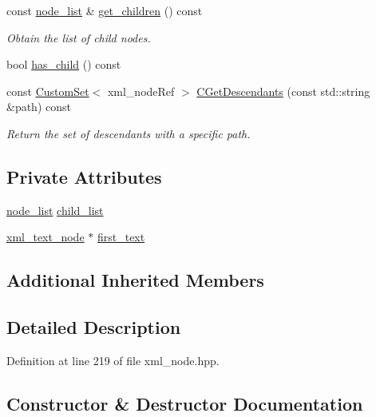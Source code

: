 \begin{DoxyCompactItemize}
const \hyperlink{classxml__node_a4e558f6b9e873e9d0e92cfc8e7880385}{node\+\_\+list} \& \hyperlink{classxml__child_a689d7129c84ed308dbf89719fa0958bf}{get\+\_\+children} () const
\begin{DoxyCompactList}\small\item\em Obtain the list of child nodes. \end{DoxyCompactList}\item 
bool \hyperlink{classxml__child_a31f81ff44aa268c1886fc9805f5c0bdd}{has\+\_\+child} () const
\item 
const \hyperlink{custom__set_8hpp_a615bc2f42fc38a4bb1790d12c759e86f}{Custom\+Set}$<$ xml\+\_\+node\+Ref $>$ \hyperlink{classxml__child_ae73bf4c48fc19ebe96e54bfdad7cfe5a}{C\+Get\+Descendants} (const std\+::string \&path) const
\begin{DoxyCompactList}\small\item\em Return the set of descendants with a specific path. \end{DoxyCompactList}\end{DoxyCompactItemize}
\subsection*{Private Attributes}
\begin{DoxyCompactItemize}
\item 
\hyperlink{classxml__node_a4e558f6b9e873e9d0e92cfc8e7880385}{node\+\_\+list} \hyperlink{classxml__child_a82e6e6bc4bd2ca3e594107350acf37f1}{child\+\_\+list}
\item 
\hyperlink{classxml__text__node}{xml\+\_\+text\+\_\+node} $\ast$ \hyperlink{classxml__child_a2bb3816676f50317a11bd47c253ec792}{first\+\_\+text}
\end{DoxyCompactItemize}
\subsection*{Additional Inherited Members}


\subsection{Detailed Description}


Definition at line 219 of file xml\+\_\+node.\+hpp.



\subsection{Constructor \& Destructor Documentation}
\mbox{\label{classxml__child_ab86f5857a17d7ff02e38af048d5341a7}} 
